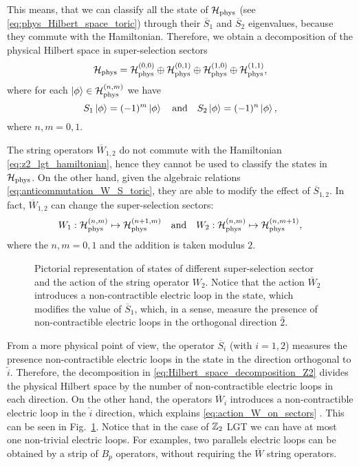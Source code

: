This means, that we can classify all the state of $\mathcal{H}_{\text{phys}}$ (see \eqref{eq:phys_Hilbert_space_toric}) through their $\overline{S}_1$ and $\overline{S}_2$ eigenvalues, because they commute with the Hamiltonian.
Therefore, we obtain a decomposition of the physical Hilbert space in super-selection sectors
\begin{equation}
    \mathcal{H}_{\text{phys}} = \mathcal{H}_{\text{phys}}^{(0,0)} \oplus \mathcal{H}_{\text{phys}}^{(0,1)} \oplus \mathcal{H}_{\text{phys}}^{(1,0)} \oplus \mathcal{H}_{\text{phys}}^{(1,1)},
    \label{eq:Hilbert_space_decomposition_Z2}
\end{equation}
where for each $\ket{\phi} \in \mathcal{H}_{\text{phys}}^{(n,m)}$ we have
\begin{equation}
    S_1 \ket{\phi} = (-1)^{m} \ket{\phi}
    \qand
    S_2 \ket{\phi} = (-1)^{n} \ket{\phi},
\end{equation}
where $n, m = 0, 1$.

The string operators $\overline{W}_{1,2}$ do not commute with the Hamiltonian \eqref{eq:z2_lgt_hamiltonian}, hence they cannot be used to classify the states in $\mathcal{H}_{\text{phys}}$.
On the other hand, given the algebraic relations \eqref{eq:anticommutation_W_S_toric}, they are able to modify the effect of $\overline{S}_{1,2}$.
In fact, $\overline{W}_{1,2}$ can change the super-selection sectors:
\begin{equation}
    W_1 : \Hphys^{(n,m)} \mapsto \Hphys^{(n+1,m)}
    \qand
    W_2 : \Hphys^{(n,m)} \mapsto \Hphys^{(n,m+1)},
    \label{eq:action_W_on_sectors}
\end{equation}
where the $n,m = 0, 1$ and the addition is taken modulus $2$.


\begin{figure}[t]
    \centering
    
    \vspace*{-0.5cm}
    \caption{%
        Pictorial representation of states of different super-selection sector and the action of the string operator $W_2$.
        Notice that the action $\overline{W}_2$ introduces a non-contractible electric loop in the state, which modifies the value of $\overline{S}_1$, which, in a sense, measure the presence of non-contractible electric loops in the orthogonal direction $\hat{2}$.%
        }
    \label{fig:sector_mapping}
\end{figure}

From a more physical point of view, the operator $\overline{S}_i$ (with $i=1,2$) measures the presence non-contractible electric loops in the state in the direction orthogonal to $\hat{i}$.
Therefore, the decomposition in \eqref{eq:Hilbert_space_decomposition_Z2} divides the physical Hilbert space by the number of non-contractible electric loops in each direction.
On the other hand, the operators $\overline{W}_i$ introduces a non-contractible electric loop in the $\hat{i}$ direction, which explains \eqref{eq:action_W_on_sectors} .
This can be seen in Fig.~\ref{fig:sector_mapping}.
Notice that in the case of $\mathbb{Z}_2$ LGT we can have at most one non-trivial electric loops.
For examples, two parallels electric loops can be obtained by a strip of $B_p$ operators, without requiring the $\overline{W}$ string operators.
